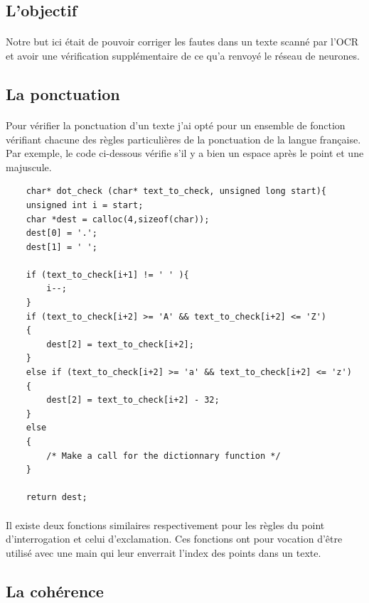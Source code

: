 \documentclass{article}
\begin{document}
\subsection{L'objectif}

\paragraph{}Notre but ici était de pouvoir corriger les fautes dans un texte scanné par l’OCR et avoir une vérification supplémentaire de ce qu’a renvoyé le réseau de neurones.

\subsection{La ponctuation}

\paragraph{}
Pour vérifier la ponctuation d’un texte j'ai opté pour un ensemble de fonction vérifiant chacune des règles particulières de la ponctuation de la langue française. Par exemple, le code ci-dessous vérifie s'il y a bien un espace après le point et une majuscule.

\begin{lstlisting}
	char* dot_check (char* text_to_check, unsigned long start){
    unsigned int i = start;
    char *dest = calloc(4,sizeof(char));
    dest[0] = '.';
    dest[1] = ' ';

    if (text_to_check[i+1] != ' ' ){
        i--;
    }
    if (text_to_check[i+2] >= 'A' && text_to_check[i+2] <= 'Z')
    {
        dest[2] = text_to_check[i+2];
    }
    else if (text_to_check[i+2] >= 'a' && text_to_check[i+2] <= 'z')
    {
        dest[2] = text_to_check[i+2] - 32;
    }
    else
    {
        /* Make a call for the dictionnary function */
    }

    return dest;
\end{lstlisting}

\paragraph{}Il existe deux fonctions similaires respectivement pour les règles du point d’interrogation et celui d’exclamation. Ces fonctions ont pour vocation d'être utilisé avec une main qui leur enverrait l’index des points dans un texte.

\subsection{La cohérence}
\end{document}
